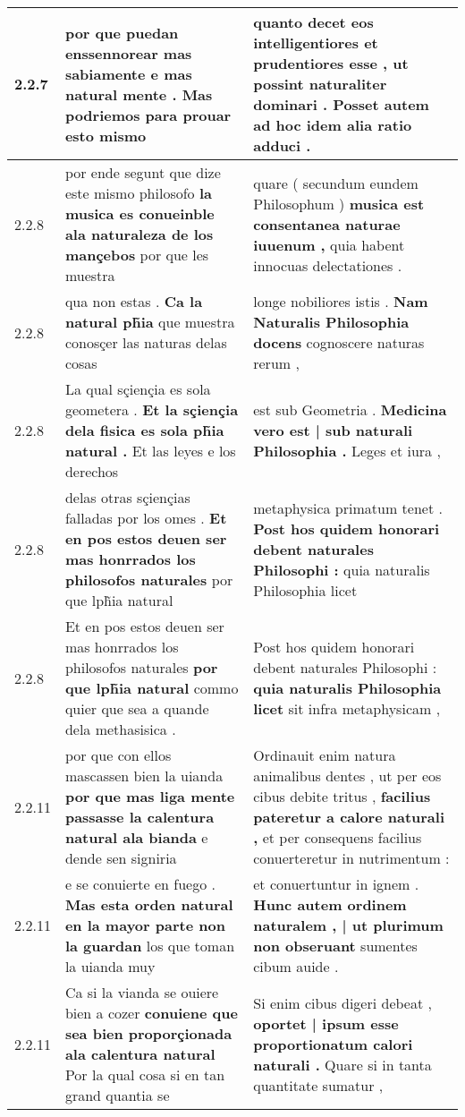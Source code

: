 \begin{tabular}{|p{1cm}|p{6.5cm}|p{6.5cm}|}
2.2.7 & por que puedan \textbf{ enssennorear mas sabiamente e mas natural mente . } Mas podriemos para prouar esto mismo & quanto decet eos intelligentiores et prudentiores esse , \textbf{ ut possint naturaliter dominari . } Posset autem ad hoc idem alia ratio adduci . \\\hline
2.2.8 & por ende segunt que dize este mismo philosofo \textbf{ la musica es conueinble ala naturaleza de los mançebos } por que les muestra & quare ( secundum eundem Philosophum ) \textbf{ musica est consentanea naturae iuuenum , } quia habent innocuas delectationes . \\\hline
2.2.8 & qua non estas . \textbf{ Ca la natural ph̃ia } que muestra conosçer las naturas delas cosas & longe nobiliores istis . \textbf{ Nam Naturalis Philosophia docens } cognoscere naturas rerum , \\\hline
2.2.8 & La qual sçiençia es sola geometera . \textbf{ Et la sçiençia dela fisica es sola ph̃ia natural . } Et las leyes e los derechos & est sub Geometria . \textbf{ Medicina vero est | sub naturali Philosophia . } Leges et iura , \\\hline
2.2.8 & delas otras sçiençias falladas por los omes . \textbf{ Et en pos estos deuen ser mas honrrados los philosofos naturales } por que lph̃ia natural & metaphysica primatum tenet . \textbf{ Post hos quidem honorari debent naturales Philosophi : } quia naturalis Philosophia licet \\\hline
2.2.8 & Et en pos estos deuen ser mas honrrados los philosofos naturales \textbf{ por que lph̃ia natural } commo quier que sea a quande dela methasisica . & Post hos quidem honorari debent naturales Philosophi : \textbf{ quia naturalis Philosophia licet } sit infra metaphysicam , \\\hline
2.2.11 & por que con ellos mascassen bien la uianda \textbf{ por que mas liga mente passasse la calentura natural ala bianda } e dende sen signiria & Ordinauit enim natura animalibus dentes , ut per eos cibus debite tritus , \textbf{ facilius pateretur a calore naturali , } et per consequens facilius conuerteretur in nutrimentum : \\\hline
2.2.11 & e se conuierte en fuego . \textbf{ Mas esta orden natural en la mayor parte non la guardan } los que toman la uianda muy & et conuertuntur in ignem . \textbf{ Hunc autem ordinem naturalem , | ut plurimum non obseruant } sumentes cibum auide . \\\hline
2.2.11 & Ca si la vianda se ouiere bien a cozer \textbf{ conuiene que sea bien proporçionada ala calentura natural } Por la qual cosa si en tan grand quantia se & Si enim cibus digeri debeat , \textbf{ oportet | ipsum esse proportionatum calori naturali . } Quare si in tanta quantitate sumatur , \\\hline

\end{tabular}
